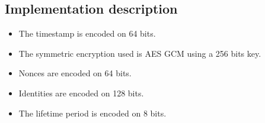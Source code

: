 
\subsection{Implementation description}

\begin{itemize}
    \item The timestamp is encoded on 64 bits.
    \item The symmetric encryption used is AES GCM using a 256 bits key.
    \item Nonces are encoded on 64 bits.
    \item Identities are encoded on 128 bits.
    \item The lifetime period is encoded on 8 bits.
\end{itemize}